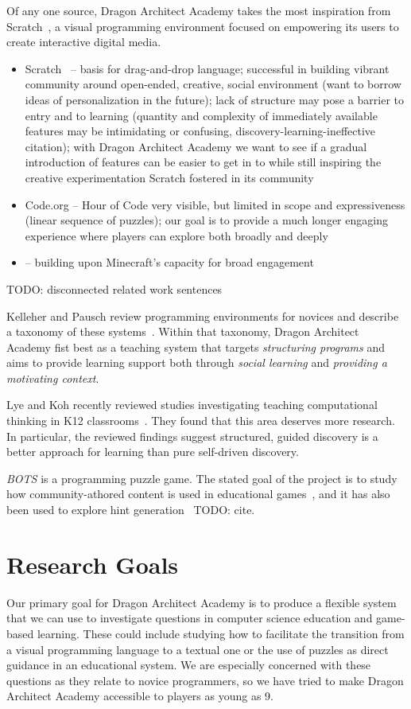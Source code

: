 \documentclass{sig-alternate}
\newcommand{\TODO}[1]{{\color{red} TODO: #1}}
\newcommand{\gametitle}{{\color{RoyalPurple} Dragon Architect Academy}}
\begin{document}
Of any one source, \gametitle{} takes the most inspiration from Scratch~\cite{maloney2010scratch}, a visual programming environment focused on empowering its users to create interactive digital media.
\begin{itemize}
\item Scratch~\cite{maloney2010scratch} -- basis for drag-and-drop language; successful in building vibrant community around open-ended, creative, social environment (want to borrow ideas of personalization in the future); lack of structure may pose a barrier to entry and to learning (quantity and complexity of immediately available features may be intimidating or confusing, discovery-learning-ineffective citation); with \gametitle{} we want to see if a gradual introduction of features can be easier to get in to while still inspiring the creative experimentation Scratch fostered in its community
\item Code.org -- Hour of Code very visible, but limited in scope and expressiveness (linear sequence of puzzles); our goal is to provide a much longer engaging experience where players can explore both broadly and deeply
\item \cite{zorn2013minecraft} -- building upon Minecraft's capacity for broad engagement
\end{itemize}

\TODO{disconnected related work sentences}

Kelleher and Pausch review programming environments for novices and describe a taxonomy of these systems~\cite{kelleher2005lowering}. Within that taxonomy, \gametitle{} fist best as a teaching system that targets \emph{structuring programs} and aims to provide learning support both through \emph{social learning} and \emph{providing a motivating context}.

Lye and Koh recently reviewed studies investigating teaching computational thinking in K12 classrooms~\cite{lye2014review}. They found that this area deserves more research. In particular, the reviewed findings suggest structured, guided discovery is a better approach for learning than pure self-driven discovery.

\emph{BOTS} is a programming puzzle game. The stated goal of the project is to study how community-athored content is used in educational games~\cite{hickspart14}, and it has also been used to explore hint generation~\TODO{cite}.


\section{Research Goals}
\label{sec:goals}
Our primary goal for \gametitle{} is to produce a flexible system that we can use to investigate questions in computer science education and game-based learning. These could include studying how to facilitate the transition from a visual programming language to a textual one or the use of puzzles as direct guidance in an educational system. We are especially concerned with these questions as they relate to novice programmers, so we have tried to make \gametitle{} accessible to players as young as 9.
\end{document}
